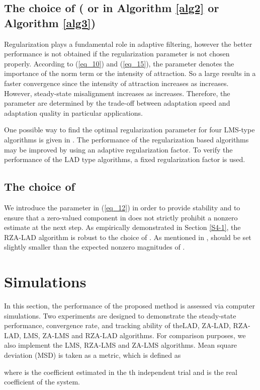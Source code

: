 \documentclass[conference]{IEEEtran}
\begin{document}
\subsection{The choice of  ( or  in Algorithm \ref{alg2} or Algorithm \ref{alg3})}
\label{S3-1}
Regularization plays a fundamental role in adaptive filtering, however the better performance is not obtained if the regularization parameter is not 
chosen properly. According to  (\ref{eq_10}) and (\ref{eq_15}), the parameter  denotes the importance of the  norm term or the intensity of attraction. So a large  results in a faster convergence since the intensity of attraction increases as  increases. However, steady-state misalignment increases as  increases. Therefore, the parameter  are determined by the trade-off between adaptation speed and adaptation quality in particular applications. 

One possible way to find the optimal regularization parameter  for four LMS-type algorithms is given in \cite{ref22}. The performance of the regularization based algorithms may be improved by using an adaptive regularization factor. To verify the performance of the LAD type algorithms, a fixed regularization factor is used.

\subsection{The choice of }
\label{S3-2}
We introduce the parameter  in (\ref{eq_12}) in order to provide stability and
to ensure that a zero-valued component in  does not strictly prohibit a
nonzero estimate at the next step. As empirically demonstrated in Section \ref{S4-1}, the RZA-LAD algorithm is robust to the choice of .
As mentioned in \cite{refrl},  should be set slightly smaller than the expected nonzero magnitudes of .
\section{Simulations}
\label{S4}
In this section, the performance of the proposed method is assessed via computer simulations. Two experiments are designed to demonstrate the steady-state performance, convergence rate, and tracking ability of theLAD, ZA-LAD, RZA-LAD, LMS, ZA-LMS and RZA-LAD algorithms. For comparison purposes, we also implement the LMS, RZA-LMS and ZA-LMS algorithms. Mean square deviation (MSD) is taken as a metric, which is defined as 

where  is the coefficient estimated in the th  independent trial and  is the real coefficient of the system.
\end{document}
